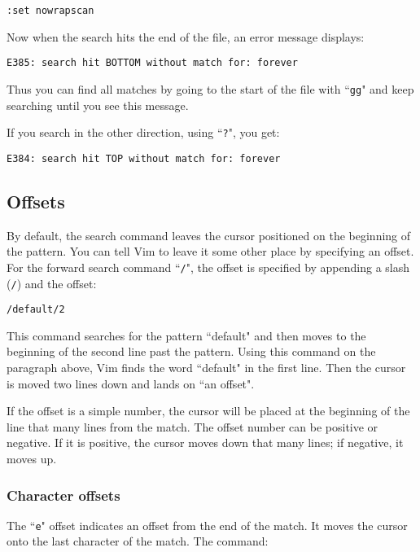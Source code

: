 \begin{Verbatim}[samepage=true]
 :set nowrapscan
\end{Verbatim}

Now when the search hits the end of the file, an error message displays:

\begin{Verbatim}[samepage=true]
    E385: search hit BOTTOM without match for: forever
\end{Verbatim}

Thus you can find all matches by going to the start of the file with ``\texttt{gg}" and keep searching until you see this message.

If you search in the other direction, using ``\texttt{?}", you get:

\begin{Verbatim}[samepage=true]
    E384: search hit TOP without match for: forever
\end{Verbatim}
\subsection{Offsets}
By default, the search command leaves the cursor positioned on the beginning of the pattern.
You can tell Vim to leave it some other place by specifying an offset.
For the forward search command ``\texttt{/}", the offset is specified by appending a slash (\texttt{/}) and the offset:

\begin{Verbatim}[samepage=true]
 /default/2
\end{Verbatim}

This command searches for the pattern ``default" and then moves to the beginning of the second line past the pattern.
Using this command on the paragraph above, Vim finds the word ``default" in the first line.
Then the cursor is moved two lines down and lands on ``an offset".

If the offset is a simple number, the cursor will be placed at the beginning of the line that many lines from the match.
The offset number can be positive or negative.
If it is positive, the cursor moves down that many lines; if negative, it moves up.

\subsubsection{Character offsets}
The ``\texttt{e}" offset indicates an offset from the end of the match.
It moves the cursor onto the last character of the match.
The command:

